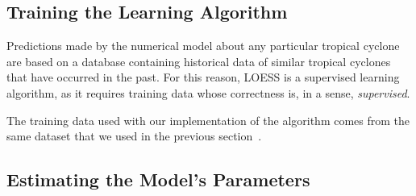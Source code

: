 \documentclass[letterpaper,twocolumn,10pt]{article}
\begin{document}
\subsection{Training the Learning Algorithm}
Predictions made by the numerical model about any particular tropical cyclone
are based on a database containing historical data of similar tropical cyclones
that have occurred in the past. For this reason, LOESS is a supervised learning
algorithm, as it requires training data whose correctness is, in a sense,
\emph{supervised}.

The training data used with our implementation of the algorithm comes from 
the same dataset that we used in the previous section~\cite{BestTrackDataset}.

\subsection{Estimating the Model's Parameters}







\end{document}
